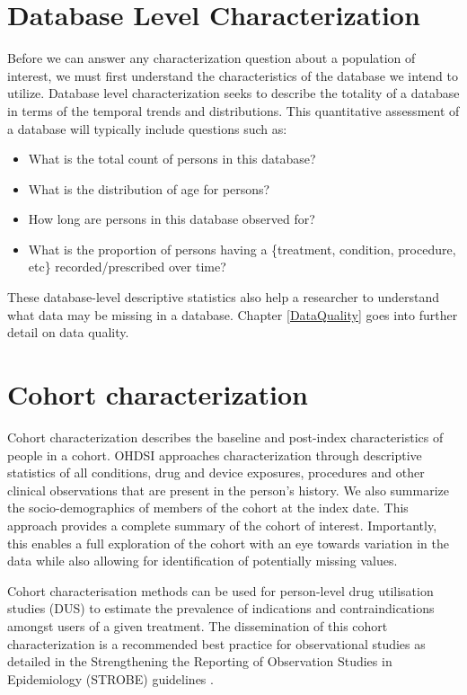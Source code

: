 \documentclass[11pt]{book}
\providecommand{\tightlist}{%
  \setlength{\itemsep}{0pt}\setlength{\parskip}{0pt}}
\theoremstyle{definition}
\theoremstyle{definition}
\theoremstyle{definition}
\theoremstyle{remark}
\begin{document}
\hypertarget{database-level-characterization}{%
\section{Database Level Characterization}\label{database-level-characterization}}

Before we can answer any characterization question about a population of interest, we must first understand the characteristics of the database we intend to utilize. Database level characterization seeks to describe the totality of a database in terms of the temporal trends and distributions. This quantitative assessment of a database will typically include questions such as:

\begin{itemize}
\tightlist
\item
  What is the total count of persons in this database?
\item
  What is the distribution of age for persons?
\item
  How long are persons in this database observed for?
\item
  What is the proportion of persons having a \{treatment, condition, procedure, etc\} recorded/prescribed over time?
\end{itemize}

These database-level descriptive statistics also help a researcher to understand what data may be missing in a database. Chapter \ref{DataQuality} goes into further detail on data quality.

\hypertarget{cohort-characterization}{%
\section{Cohort characterization}\label{cohort-characterization}}

Cohort characterization describes the baseline and post-index characteristics of people in a cohort. OHDSI approaches characterization through descriptive statistics of all conditions, drug and device exposures, procedures and other clinical observations that are present in the person's history. We also summarize the socio-demographics of members of the cohort at the index date. This approach provides a complete summary of the cohort of interest. Importantly, this enables a full exploration of the cohort with an eye towards variation in the data while also allowing for identification of potentially missing values.

Cohort characterisation methods can be used for person-level drug utilisation studies (DUS) to estimate the prevalence of indications and contraindications amongst users of a given treatment. The dissemination of this cohort characterization is a recommended best practice for observational studies as detailed in the Strengthening the Reporting of Observation Studies in Epidemiology (STROBE) guidelines \citep{VONELM2008344}.
\end{document}
